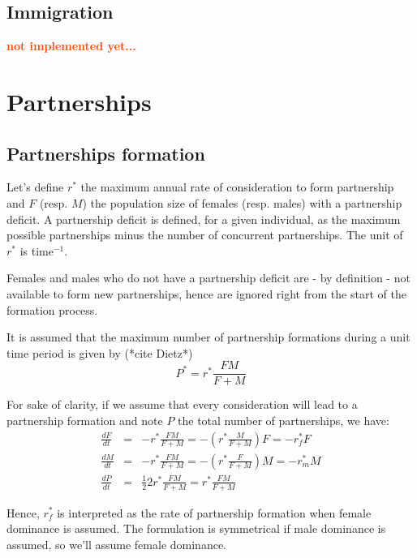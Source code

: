 \documentclass[11pt, onecolumn]{article}
\newcommand{\warning}[1]{\textbf{\textcolor{OrangeRed}{#1}}}
\begin{document}
\subsection{Immigration}
\warning{not implemented yet...}




\section{Partnerships}


\subsection{Partnerships formation}

Let's define $r^*$ the maximum annual rate of consideration to form partnership and $F$ (resp. $M$) the population size of females (resp. males) with a partnership deficit. A partnership deficit is defined, for a given individual, as the maximum possible partnerships minus the number of concurrent partnerships. The unit of $r^*$ is time$^{-1}$.

Females and males who do not have a partnership deficit are - by definition - not available to form new partnerships, hence are ignored right from the start of the formation process.

It is assumed that the maximum number of partnership formations during a unit time period is given by (*cite Dietz*) 
$$P^* = r^*\frac{FM}{F+M}$$

For sake of clarity, if we assume that every consideration will lead to a partnership formation and note $P$ the total number of partnerships, we have:
\begin{eqnarray*}
\frac{dF}{dt} & = & - r^*\frac{FM}{F+M} =  -\left(r^*\frac{M}{F+M}\right) F = -r^*_f F\\
\frac{dM}{dt} & = & - r^*\frac{FM}{F+M} =  -\left(r^*\frac{F}{F+M}\right) M = -r^*_m M\\
\frac{dP}{dt} & = & \frac{1}{2}2r^*\frac{FM}{F+M} = r^*\frac{FM}{F+M}
\end{eqnarray*}

Hence, $r^*_f$ is interpreted as the rate of partnership formation when female dominance is assumed. The formulation is symmetrical if male dominance is assumed, so we'll assume female dominance.
\end{document}
